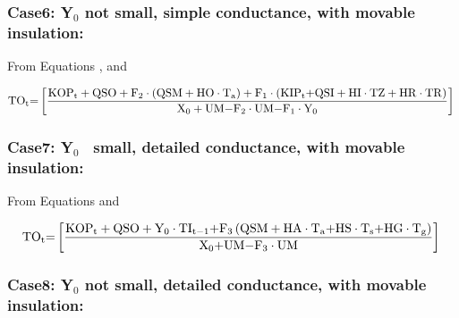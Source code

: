 \subsubsection{\texorpdfstring{Case6: Y\(_{0}\) not small, simple conductance, with movable insulation:}{Case6: Y\_\{0\} not small, simple conductance, with movable insulation:}}\label{case6-yux5f0-not-small-simple-conductance-with-movable-insulation}

From Equations , and

\begin{equation}
{\rm{T}}{{\rm{O}}_{\rm{t}}}{\rm{ = }}\left[ {\frac{{{\rm{KO}}{{\rm{P}}_{\rm{t}}} + {\rm{QSO}} + {{\rm{F}}_2}\cdot \left( {{\rm{QSM + HO}}\cdot {{\rm{T}}_{\rm{a}}}} \right) + {{\rm{F}}_1}\cdot \left( {{\rm{KI}}{{\rm{P}}_{\rm{t}}}{\rm{ + QSI + HI}}\cdot {\rm{TZ + HR}}\cdot {\rm{TR}}} \right)}}{{{{\rm{X}}_{\rm{0}}} + {\rm{UM - }}{{\rm{F}}_{\rm{2}}}\cdot {\rm{UM - }}{{\rm{F}}_{\rm{1}}}\cdot {{\rm{Y}}_{\rm{0}}}}}} \right]{\rm{  }}
\end{equation}

\subsubsection{\texorpdfstring{Case7: Y\(_{0}\)~ small, detailed conductance, with movable insulation:}{Case7: Y\_\{0\}~ small, detailed conductance, with movable insulation:}}\label{case7-yux5f0-small-detailed-conductance-with-movable-insulation}

From Equations and

\begin{equation}
{\rm{T}}{{\rm{O}}_{\rm{t}}}{\rm{ = }}\left[ {\frac{{{\rm{KO}}{{\rm{P}}_{\rm{t}}} + {\rm{QSO}} + {{\rm{Y}}_0}\cdot {\rm{T}}{{\rm{I}}_{{\rm{t - 1}}}}{\rm{ + }}{{\rm{F}}_{\rm{3}}}\left( {{\rm{QSM + HA}}\cdot {{\rm{T}}_{\rm{a}}}{\rm{ + HS}}\cdot {{\rm{T}}_{\rm{s}}}{\rm{ + HG}}\cdot {{\rm{T}}_{\rm{g}}}} \right)}}{{{{\rm{X}}_{\rm{0}}}{\rm{ + UM - }}{{\rm{F}}_{\rm{3}}}\cdot {\rm{UM}}}}} \right]{\rm{  }}
\end{equation}

\subsubsection{\texorpdfstring{Case8: Y\(_{0}\) not small, detailed conductance, with movable insulation:}{Case8: Y\_\{0\} not small, detailed conductance, with movable insulation:}}\label{case8-yux5f0-not-small-detailed-conductance-with-movable-insulation}

